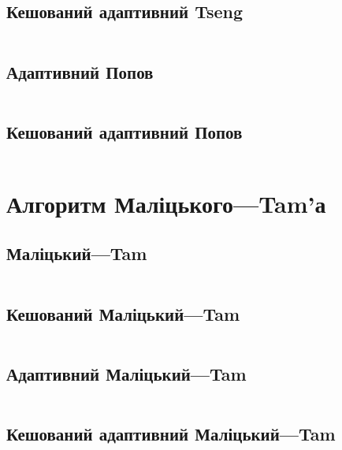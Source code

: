 \newpage
\subsection{Кешований адаптивний Tseng}
\inputminted[linenos,firstline=56,fontsize=\tiny]{python}{src/adaptive/tseng.py}

\newpage
\subsection{Адаптивний Попов}
\inputminted[linenos,firstline=8,lastline=57,fontsize=\tiny]{python}{src/adaptive/popov.py}

\newpage
\subsection{Кешований адаптивний Попов}
\inputminted[linenos,firstline=60,fontsize=\tiny]{python}{src/adaptive/popov.py}

\section{Алгоритм Маліцького---Tam'а}

\subsection{Маліцький---Tam}
\inputminted[linenos,firstline=8,lastline=41,fontsize=\tiny]{python}{src/core/malitskyi_tam.py}

\newpage
\subsection{Кешований Маліцький---Tam}
\inputminted[linenos,firstline=44,fontsize=\tiny]{python}{src/core/malitskyi_tam.py}

\newpage
\subsection{Адаптивний Маліцький---Tam}
\inputminted[linenos,firstline=8,lastline=53,fontsize=\tiny]{python}{src/adaptive/malitskyi_tam.py}

\newpage
\subsection{Кешований адаптивний Маліцький---Tam}
\inputminted[linenos,firstline=56,fontsize=\tiny]{python}{src/adaptive/malitskyi_tam.py}
